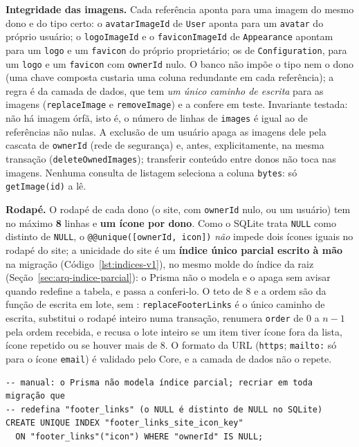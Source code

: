 \textbf{Integridade das imagens.} Cada referência aponta para uma imagem do mesmo dono e do tipo certo: o \texttt{avatarImageId} de \texttt{User} aponta para um \texttt{avatar} do próprio usuário; o \texttt{logoImageId} e o \texttt{faviconImageId} de \texttt{Appearance} apontam para um \texttt{logo} e um \texttt{favicon} do próprio proprietário; os de \texttt{Configuration}, para um \texttt{logo} e um \texttt{favicon} com \texttt{ownerId} nulo. O banco não impõe o tipo nem o dono (uma chave composta custaria uma coluna redundante em cada referência); a regra é da camada de dados, que tem \emph{um único caminho de escrita} para as imagens (\texttt{replaceImage} e \texttt{removeImage}) e a confere em teste. Invariante testada: não há imagem órfã, isto é, o número de linhas de \texttt{images} é igual ao de referências não nulas. A exclusão de um usuário apaga as imagens dele pela cascata de \texttt{ownerId} (rede de segurança) e, antes, explicitamente, na mesma transação (\texttt{deleteOwnedImages}); transferir conteúdo entre donos não toca nas imagens. Nenhuma consulta de listagem seleciona a coluna \texttt{bytes}: só \texttt{getImage(id)} a lê.

\textbf{Rodapé.} O rodapé de cada dono (o site, com \texttt{ownerId} nulo, ou um usuário) tem no máximo \textbf{8} linhas e \textbf{um ícone por dono}. Como o SQLite trata \texttt{NULL} como distinto de \texttt{NULL}, o \texttt{@@unique([ownerId, icon])} \emph{não} impede dois ícones iguais no rodapé do site; a unicidade do site é um \textbf{índice único parcial escrito à mão} na migração (Código~\ref{lst:indices-v1}), no mesmo molde do índice da raiz (Seção~\ref{sec:arq-indice-parcial}): o Prisma não o modela e o apaga sem avisar quando redefine a tabela, e  passa a conferi-lo. O teto de 8 e a ordem são da função de escrita em lote, sem : \texttt{replaceFooterLinks} é o único caminho de escrita, substitui o rodapé inteiro numa transação, renumera \texttt{order} de 0 a $n-1$ pela ordem recebida, e recusa o lote inteiro se um item tiver ícone fora da lista, ícone repetido ou se houver mais de 8. O formato da URL (\texttt{https}; \texttt{mailto:} só para o ícone \texttt{email}) é validado pelo Core, e a camada de dados não o repete.

\begin{lstlisting}[caption={Índices acrescentados pelo épico v1 (SQL manual na migração)}, label={lst:indices-v1}]
-- manual: o Prisma não modela índice parcial; recriar em toda migração que
-- redefina "footer_links" (o NULL é distinto de NULL no SQLite)
CREATE UNIQUE INDEX "footer_links_site_icon_key"
  ON "footer_links"("icon") WHERE "ownerId" IS NULL;
\end{lstlisting}

